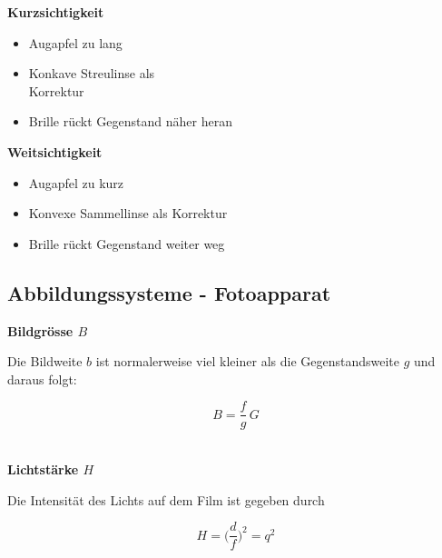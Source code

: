 \begin{minipage}{0.48\linewidth}
\textbf{Kurzsichtigkeit} 
\raggedright
\begin{itemize}

\item Augapfel zu lang
\item Konkave Streulinse als\\
	 Korrektur
\item Brille rückt Gegenstand näher heran 

\end{itemize}


\end{minipage}
\hfill
\begin{minipage}{0.48\linewidth}
\raggedright
\textbf{Weitsichtigkeit}
\begin{itemize}

\item Augapfel zu kurz
\item Konvexe Sammellinse als Korrektur
\item Brille rückt Gegenstand weiter weg 

\end{itemize}


\end{minipage}



\subsection{Abbildungssysteme - Fotoapparat}

\textbf{Bildgrösse $B$} 

\begin{minipage}{0.48\linewidth}
Die Bildweite $b$ ist normalerweise viel kleiner als die
Gegenstandsweite $g$ und daraus folgt: \\
\end{minipage}
\hfill
\begin{minipage}{0.48\linewidth}
$$ \boxed{ B = \frac{f}{g} \, G }$$ \\
\end{minipage}


\textbf{Lichtstärke $H$} 

\begin{minipage}{0.48\linewidth}
Die Intensität des Lichts auf dem Film ist gegeben durch \\
\end{minipage}
\hfill
\begin{minipage}{0.48\linewidth}
$$ \boxed{ H = \Big(  \frac{d}{f} \Big)^2 = q^2 } $$ \\
\end{minipage}




